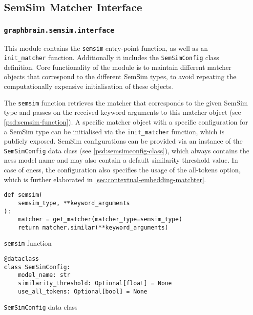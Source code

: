 \documentclass[11pt]{scrreprt}
\begin{document}
{\subsection{SemSim Matcher Interface}

\subsubsection{\texttt{graphbrain.semsim.interface}}
\label{sec:graphbrain.semsim.interface}
This module contains the \texttt{semsim} entry-point function, as well as an \texttt{init\_matcher} function. Additionally it includes the 
\texttt{SemSimConfig} class definition. Core functionality of the module is to maintain different matcher objects that correspond to the different SemSim types, to avoid repeating the computationally expensive initialisation of these objects.

The \texttt{semsim} function retrieves the matcher that corresponds to the given SemSim type and passes on the received keyword arguments to this matcher object (see \cref{psd:semsim-function}). A specific matcher object with a specific configuration for a SemSim type can be initialised via the \texttt{init\_matcher} function, which is publicly exposed. 
SemSim configurations can be provided via an instance of the \texttt{SemSimConfig} data class (see \cref{psd:semsimconfig-class}), which always contains the \gls{ness} model name and may also contain a default similarity threshold value. In case of \gls{cness}, the configuration also specifies the usage of the all-tokens option, which is further elaborated in \cref{sec:contextual-embedding-matchter}.

\begin{pseudo}
\begin{lstlisting}
def semsim(
    semsim_type, **keyword_arguments
):
    matcher = get_matcher(matcher_type=semsim_type)
    return matcher.similar(**keyword_arguments)
\end{lstlisting}
\caption{\texttt{semsim} function}
\label{psd:semsim-function}
\end{pseudo}

\begin{pseudo}
\begin{lstlisting}
@dataclass
class SemSimConfig:
    model_name: str
    similarity_threshold: Optional[float] = None
    use_all_tokens: Optional[bool] = None
\end{lstlisting}
\caption{\texttt{SemSimConfig} data class}
\label{psd:semsimconfig-class}
\end{pseudo}


}
\end{document}
